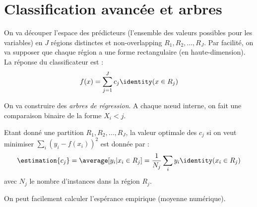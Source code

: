 \section{Classification avancée et arbres}
    On va découper l'espace des prédicteurs (l'ensemble des valeurs possibles pour les variables) en \(J\) régions distinctes et non-overlapping \(R_1, R_2, \dots, R_J\). Par facilité, on va supposer que chaque région a une forme rectangulaire (en haute-dimension). La réponse du classificateur est :
    \[
        f(x) = \sum_{j=1}^J c_j \identity(x \in R_j)
    \]

    \begin{definition}
        On va construire des \textit{arbres de régression}. A chaque nœud interne, on fait une comparaison binaire de la forme \(X_i < j\).

        Etant donné une partition \(R_1, R_2, \dots, R_J\), la valeur optimale des \(c_j\) si on veut minimiser \(\sum_i (y_i - f(x_i))^2\) est donnée par :
        \[
            \estimation{c_j} = \average[y_i | x_i \in R_j] = \frac{1}{N_j} \sum_i y_i \identity(x_i \in R_j)
        \]
        avec \(N_j\) le nombre d'instances dans la région \(R_j\).

        On peut facilement calculer l'espérance empirique (moyenne numérique).
    \end{definition}

